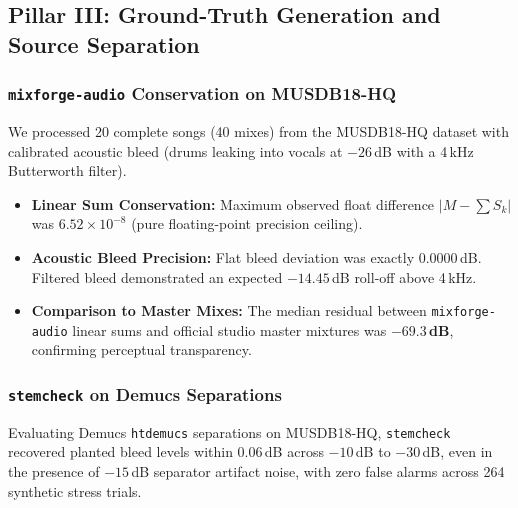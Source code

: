 \documentclass[10pt,journal,compsoc]{IEEEtran}
\begin{document}
\subsection{Pillar III: Ground-Truth Generation and Source Separation}

\subsubsection{\texttt{mixforge-audio} Conservation on MUSDB18-HQ}
We processed 20 complete songs (40 mixes) from the MUSDB18-HQ dataset with calibrated acoustic bleed (drums leaking into vocals at $-26$\,dB with a 4\,kHz Butterworth filter).
\begin{itemize}
    \item \textbf{Linear Sum Conservation:} Maximum observed float difference $|M - \sum S_k|$ was $6.52 \times 10^{-8}$ (pure floating-point precision ceiling).
    \item \textbf{Acoustic Bleed Precision:} Flat bleed deviation was exactly $0.0000$\,dB. Filtered bleed demonstrated an expected $-14.45$\,dB roll-off above 4\,kHz.
    \item \textbf{Comparison to Master Mixes:} The median residual between \texttt{mixforge-audio} linear sums and official studio master mixtures was \textbf{$-69.3$\,dB}, confirming perceptual transparency.
\end{itemize}

\subsubsection{\texttt{stemcheck} on Demucs Separations}
Evaluating Demucs \texttt{htdemucs} separations on MUSDB18-HQ, \texttt{stemcheck} recovered planted bleed levels within $0.06$\,dB across $-10$\,dB to $-30$\,dB, even in the presence of $-15$\,dB separator artifact noise, with zero false alarms across 264 synthetic stress trials.

\begin{table}[h]
\centering
\caption{Separation and Ground-Truth Evaluation on MUSDB18-HQ (Pillar III).}
\label{tab:separation_benchmarks}
\end{table}
\end{document}
